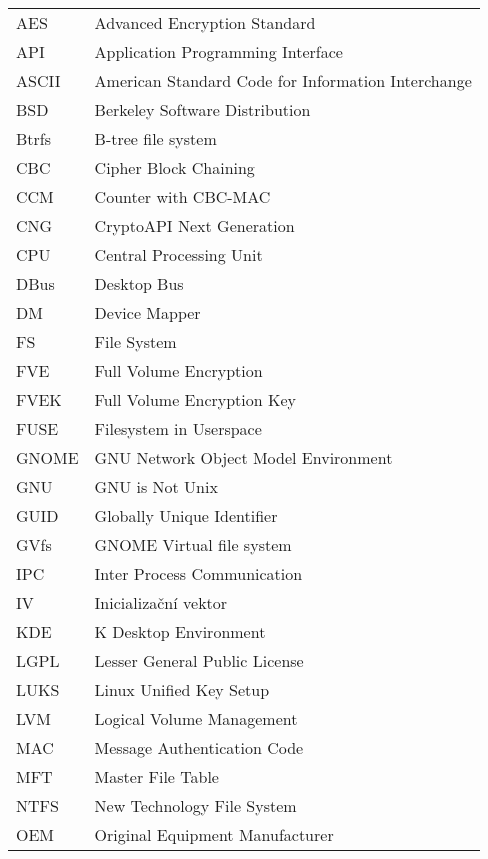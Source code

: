 
\seznamzkr

\setlength{\LTleft}{0pt}
\begin{longtable}{ll}
  AES & Advanced Encryption Standard \\
  API & Application Programming Interface \\
  ASCII & American Standard Code for Information Interchange \\
  BSD & Berkeley Software Distribution \\
  Btrfs & B-tree file system \\
  CBC & Cipher Block Chaining \\
  CCM & Counter with CBC-MAC \\
  CNG & CryptoAPI Next Generation \\
  CPU & Central Processing Unit \\
  DBus & Desktop Bus \\
  DM & Device Mapper \\
  FS &  File System \\
  FVE & Full Volume Encryption \\
  FVEK & Full Volume Encryption Key \\
  FUSE & Filesystem in Userspace \\
  GNOME & GNU Network Object Model Environment \\
  GNU & GNU is Not Unix \\
  GUID & Globally Unique Identifier \\
  GVfs & GNOME Virtual file system \\
  IPC & Inter Process Communication \\
  IV & Inicializační vektor \\
  KDE & K Desktop Environment \\
  LGPL & Lesser General Public License \\
  LUKS & Linux Unified Key Setup \\
  LVM & Logical Volume Management \\
  MAC & Message Authentication Code \\
  MFT & Master File Table \\
  NTFS & New Technology File System \\
  OEM & Original Equipment Manufacturer \\

\end{longtable}
